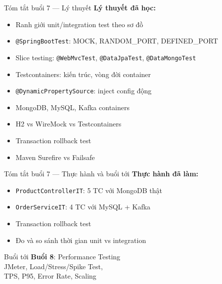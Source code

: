 \documentclass[aspectratio=169,10pt]{beamer}
\begin{document}
\begin{frame}{Tóm tắt buổi 7 --- Lý thuyết}
    \textbf{Lý thuyết đã học:}
    \begin{itemize}
      \item Ranh giới unit/integration test theo sơ đồ
      \item \texttt{@SpringBootTest}: MOCK, RANDOM\_PORT, DEFINED\_PORT
      \item Slice testing: \texttt{@WebMvcTest}, \texttt{@DataJpaTest}, \texttt{@DataMongoTest}
      \item Testcontainers: kiến trúc, vòng đời container
      \item \texttt{@DynamicPropertySource}: inject config động
      \item MongoDB, MySQL, Kafka containers
      \item H2 vs WireMock vs Testcontainers
      \item Transaction rollback test
      \item Maven Surefire vs Failsafe
    \end{itemize}
\end{frame}

\begin{frame}{Tóm tắt buổi 7 --- Thực hành và buổi tới}
    \textbf{Thực hành đã làm:}
    \begin{itemize}
      \item \texttt{ProductControllerIT}: 5 TC với MongoDB thật
      \item \texttt{OrderServiceIT}: 4 TC với MySQL + Kafka
      \item Transaction rollback test
      \item Đo và so sánh thời gian unit vs integration
    \end{itemize}

    \vspace{0.4em}
    \begin{block}{Buổi tới}
      \textbf{Buổi 8}: Performance Testing\\
      JMeter, Load/Stress/Spike Test,\\
      TPS, P95, Error Rate, Scaling
    \end{block}
\end{frame}
\end{document}
